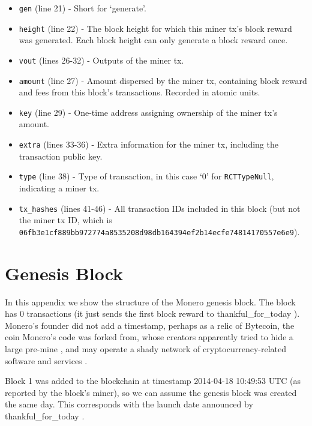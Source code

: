 \begin{appendices}
\begin{itemize}
    \item {\tt gen} (line 21) - Short for `generate'.
    \item {\tt height} (line 22) - The block height for which this miner tx's block reward was generated. Each block height can only generate a block reward once.
    \item {\tt vout} (lines 26-32) - Outputs of the miner tx.
    \item {\tt amount} (line 27) - Amount dispersed by the miner tx, containing block reward and fees from this block's transactions. Recorded in atomic units.
    \item {\tt key} (line 29) - One-time address assigning ownership of the miner tx's amount.
    \item {\tt extra} (lines 33-36) - Extra information for the miner tx, including the transaction public key.
    \item {\tt type} (line 38) - Type of transaction, in this case `0' for {\tt RCTTypeNull}, indicating a miner tx.
    \item {\tt tx\_hashes} (lines 41-46) - All transaction IDs included in this block (but not the miner tx ID, which is {\tt 06fb3e1cf889bb972774a8535208d98db164394ef2b14ecfe74814170557e6e9}).
\end{itemize}




\chapter{Genesis Block}
\label{appendix:genesis-block}

In this appendix we show the structure of the Monero genesis block. The block has 0 transactions (it just sends the first block reward to thankful\_for\_today \cite{bitmonero-launched}). Monero's founder did not add a timestamp, perhaps as a relic of Bytecoin, the coin Monero's code was forked from, whose creators apparently tried to hide a large pre-mine \cite{monero-history}, and may operate a shady network of cryptocurrency-related software and services \cite{bytecoin-network}.

Block 1 was added to the blockchain at timestamp 2014-04-18 10:49:53 UTC (as reported by the block's miner), so we can assume the genesis block was created the same day. This corresponds with the launch date announced by thankful\_for\_today \cite{bitmonero-launched}.


\end{appendices}
